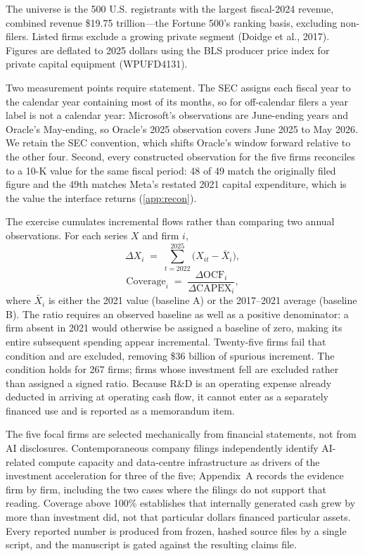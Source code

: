 \documentclass[preprint,11pt]{elsarticle}
\begin{document}
The universe is the 500 U.S. registrants with the largest fiscal-2024 revenue, combined revenue
\$19.75 trillion---the Fortune 500's ranking basis, excluding non-filers. Listed firms exclude a growing private segment (Doidge et al., 2017). Figures are deflated to
2025 dollars using the BLS producer price index for private capital equipment (WPUFD4131).

Two measurement points require statement. The SEC assigns each fiscal year to the calendar year
containing most of its months, so for off-calendar filers a year label is not a calendar year:
Microsoft's observations are June-ending years and Oracle's May-ending, so Oracle's 2025 observation
covers June 2025 to May 2026. We retain the SEC convention, which shifts Oracle's window forward
relative to the other four. Second, every constructed observation for the five firms reconciles to a
10-K value for the same fiscal period: 48 of 49 match the originally filed figure and the 49th
matches Meta's restated 2021 capital expenditure, which is the value the interface returns
(\ref{app:recon}).

The exercise cumulates incremental flows rather than comparing two annual
observations. For each series $X$ and firm $i$,
\begin{equation}
\Delta X_i \;=\; \sum_{t=2022}^{2025}\bigl(X_{it}-\bar{X}_i\bigr),
\label{eq:cum}
\end{equation}
\begin{equation}
\mathrm{Coverage}_i \;=\; \frac{\Delta \mathrm{OCF}_i}{\Delta \mathrm{CAPEX}_i},
\label{eq:cov}
\end{equation}
where $\bar{X}_i$ is either the 2021 value (baseline A) or the 2017--2021 average (baseline B). The
ratio requires an observed baseline as well as a positive denominator: a firm absent in 2021 would
otherwise be assigned a baseline of zero, making its entire subsequent spending appear incremental.
Twenty-five firms fail that condition and are excluded, removing \$36 billion of spurious increment.
The condition holds for 267 firms;
firms whose investment fell are excluded rather than assigned a signed ratio. Because R\&D is an
operating expense already deducted in arriving at operating cash flow, it cannot enter as a
separately financed use and is reported as a memorandum item.

The five focal firms are selected mechanically from financial statements, not from AI disclosures.
Contemporaneous company filings independently identify AI-related compute capacity and data-centre
infrastructure as drivers of the investment acceleration for three of the five; Appendix~A records
the evidence firm by firm, including the two cases where the filings do not support that reading.
Coverage above 100\% establishes that internally generated cash grew by more than investment did,
not that particular dollars financed particular assets. Every reported number is produced from
frozen, hashed source files by a single script, and the manuscript is gated against the resulting
claims file.
\end{document}
